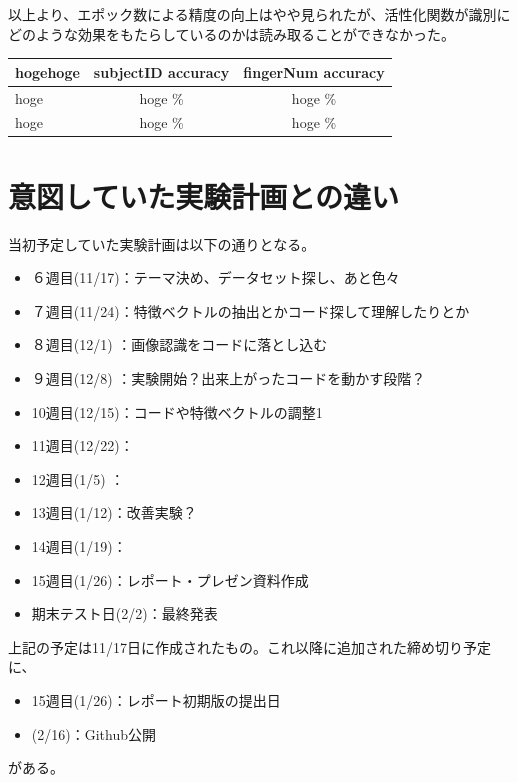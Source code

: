 \documentclass[a4paper, 11pt, titlepage]{jsarticle}
\begin{document}
以上より、エポック数による精度の向上はやや見られたが、活性化関数が識別にどのような効果をもたらしているのかは読み取ることができなかった。

\begin{table}[htb]
  \begin{tabular}{|l|c|c|}
    \hline
    hogehoge & subjectID accuracy & fingerNum accuracy  \\ \hline
    hoge & hoge \% & hoge \% \\ \hline
    hoge & hoge \% & hoge \% \\ \hline
  \end{tabular}
\end{table}

\section{意図していた実験計画との違い}
当初予定していた実験計画は以下の通りとなる。
\begin{itemize}
\item	６週目(11/17)：テーマ決め、データセット探し、あと色々
\item	７週目(11/24)：特徴ベクトルの抽出とかコード探して理解したりとか
\item	８週目(12/1)  ：画像認識をコードに落とし込む
\item	９週目(12/8)  ：実験開始？出来上がったコードを動かす段階？
\item	10週目(12/15)：コードや特徴ベクトルの調整1
\item	11週目(12/22)：
\item	12週目(1/5)  ：
\item	13週目(1/12)：改善実験？
\item	14週目(1/19)：
\item	15週目(1/26)：レポート・プレゼン資料作成
\item	期末テスト日(2/2)：最終発表
\end{itemize}
上記の予定は11/17日に作成されたもの。これ以降に追加された締め切り予定に、
\begin{itemize}
\item	15週目(1/26)：レポート初期版の提出日
\item	(2/16)：Github公開
\end{itemize}
がある。
\end{document}
